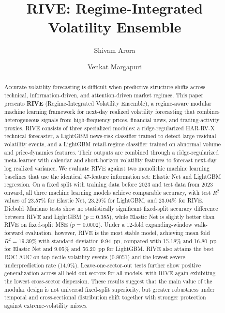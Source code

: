 \documentclass[review]{elsarticle}
\begin{document}
\begin{frontmatter}

\title{RIVE: Regime-Integrated Volatility Ensemble}

\author[inst1]{Shivam Arora}

\author[inst1]{Venkat Margapuri}


\begin{abstract}
Accurate volatility forecasting is difficult when predictive structure shifts across technical, information-driven, and attention-driven market regimes. This paper presents \textbf{RIVE} (Regime-Integrated Volatility Ensemble), a regime-aware modular machine learning framework for next-day realized volatility forecasting that combines heterogeneous signals from high-frequency prices, financial news, and trading-activity proxies. RIVE consists of three specialized modules: a ridge-regularized HAR-RV-X technical forecaster, a LightGBM news-risk classifier trained to detect large residual volatility events, and a LightGBM retail-regime classifier trained on abnormal volume and price-dynamics features. Their outputs are combined through a ridge-regularized meta-learner with calendar and short-horizon volatility features to forecast next-day log realized variance. We evaluate RIVE against two monolithic machine learning baselines that use the identical 47-feature information set: Elastic Net and LightGBM regression. On a fixed split with training data before 2023 and test data from 2023 onward, all three machine learning models achieve comparable accuracy, with test $R^2$ values of 23.57\% for Elastic Net, 23.29\% for LightGBM, and 23.04\% for RIVE. Diebold--Mariano tests show no statistically significant fixed-split accuracy difference between RIVE and LightGBM ($p=0.385$), while Elastic Net is slightly better than RIVE on fixed-split MSE ($p=0.0002$). Under a 12-fold expanding-window walk-forward evaluation, however, RIVE is the most stable model, achieving mean fold $R^2=19.39\%$ with standard deviation 9.94~pp, compared with 15.18\% and 16.80~pp for Elastic Net and 9.05\% and 56.20~pp for LightGBM. RIVE also attains the best ROC-AUC on top-decile volatility events (0.8051) and the lowest severe-underprediction rate (14.9\%). Leave-one-sector-out tests further show positive generalization across all held-out sectors for all models, with RIVE again exhibiting the lowest cross-sector dispersion. These results suggest that the main value of the modular design is not universal fixed-split superiority, but greater robustness under temporal and cross-sectional distribution shift together with stronger protection against extreme-volatility misses.
\end{abstract}


\end{frontmatter}
\end{document}
